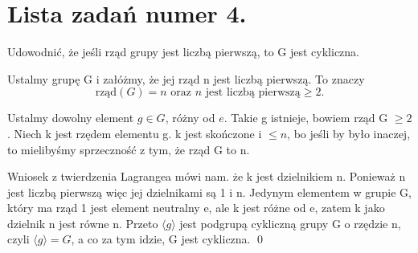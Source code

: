 \section{Lista zadań numer 4.}

\begin{problem}[1]

	Udowodnić, że jeśli rząd grupy jest liczbą pierwszą, to G jest cykliczna.
\end{problem}
\begin{solution}
	
	Ustalmy grupę G i załóżmy, że jej rząd n jest liczbą pierwszą. To znaczy \[
	\text{rząd}\left( G \right) = n\text{ oraz } n \text{ jest liczbą pierwszą} \ge 2
	.\] 

	Ustalmy dowolny element $g \in G$, różny od $e$. Takie g istnieje, bowiem rząd G $\ge 2$. Niech k jest rzędem elementu g. k jest skończone i $\le n$, bo jeśli by było inaczej, to mielibyśmy sprzeczność z tym, że rząd G to n.
	
	Wniosek z twierdzenia Lagrangea mówi nam. że k jest dzielnikiem n. Ponieważ n jest liczbą pierwszą więc jej dzielnikami są 1 i n. Jedynym elementem w grupie G, który ma rząd 1 jest element neutralny e, ale k jest różne od e, zatem k jako dzielnik n jest równe n. Przeto $\langle g \rangle $ jest podgrupą cykliczną grupy G o rzędzie n, czyli $\langle g \rangle = G$, a co za tym idzie, G jest cykliczna.
\hfill\qed
\end{solution}

